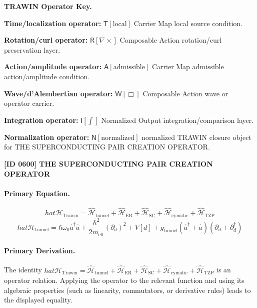 \par\vspace{0.45\baselineskip}
\noindent\begin{minipage}[t]{\linewidth}
\begingroup
\small
\raggedright
\textbf{TRAWIN Operator Key.}\par
\noindent\textbf{Time/localization operator:} $\mathsf{T}\!\left[\mathrm{local}\right]$ Carrier Map local source condition.\par
\noindent\textbf{Rotation/curl operator:} $\mathsf{R}\!\left[\nabla\times\right]$ Composable Action rotation/curl preservation layer.\par
\noindent\textbf{Action/amplitude operator:} $\mathsf{A}\!\left[\mathrm{admissible}\right]$ Carrier Map admissible action/amplitude condition.\par
\noindent\textbf{Wave/d'Alembertian operator:} $\mathsf{W}\!\left[\Box\right]$ Composable Action wave or operator carrier.\par
\noindent\textbf{Integration operator:} $\mathsf{I}\!\left[\int\right]$ Normalized Output integration/comparison layer.\par
\noindent\textbf{Normalization operator:} $\mathsf{N}\!\left[\mathrm{normalized}\right]$ normalized TRAWIN closure object for THE SUPERCONDUCTING PAIR CREATION OPERATOR.\par
\endgroup
\end{minipage}

\clearpage
\noindent\textbf{[ID 0600] THE SUPERCONDUCTING PAIR CREATION OPERATOR}\par
\vspace{0.35em}
\paragraph{Primary Equation.}
\[
hat{\mathcal{H}}_{\text{Trawin}} = \hat{\mathcal{H}}_{\text{tunnel}} + \hat{\mathcal{H}}_{\text{ER}} + \hat{\mathcal{H}}_{\text{SC}} + \hat{\mathcal{H}}_{\text{cymatic}} + \hat{\mathcal{H}}_{\text{TZP}}
\]
\[
hat{\mathcal{H}}_{\text{tunnel}} = \hbar \omega_0 \hat{a}^\dagger \hat{a} + \frac{\hbar^2}{2m_{\text{eff}}} (\partial_d)^2 + V[d] + g_{\text{tunnel}} (\hat{a}^\dagger + \hat{a})(\partial_d + \partial_d^\dagger)
\]

\paragraph{Primary Derivation.}
The identity \( hat{\mathcal{H}}_{\text{Trawin}} = \hat{\mathcal{H}}_{\text{tunnel}} + \hat{\mathcal{H}}_{\text{ER}} + \hat{\mathcal{H}}_{\text{SC}} + \hat{\mathcal{H}}_{\text{cymatic}} + \hat{\mathcal{H}}_{\text{TZP}} \) is an operator relation. Applying the operator to the relevant function and using its algebraic properties (such as linearity, commutators, or derivative rules) leads to the displayed equality.
